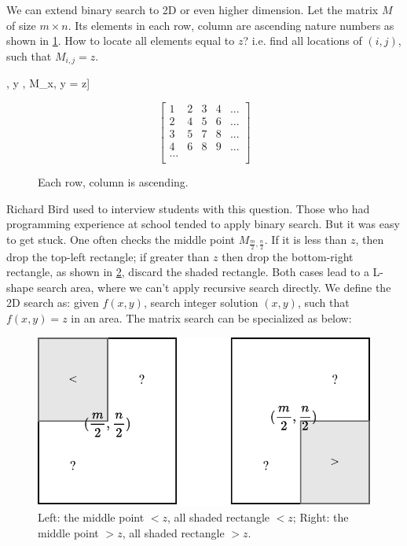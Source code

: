 \documentclass[b5paper]{article}
\begin{document}
We can extend binary search to 2D or even higher dimension. Let the matrix $M$ of size $m \times n$. Its elements in each row, column are ascending nature numbers as shown in \cref{fig:matrix-eg}. How to locate all elements equal to $z$? i.e. find all locations of $(i, j)$, such that $M_{i,j} = z$.

\be
[(x, y) | x \gets [1, 2,..., m], y \gets [1, 2,..., n], M_{x, y} = z]
\label{eq:bsearch-brute}
\ee

\begin{figure}[htbp]
 \centering
\[
\left [
  \begin{array}{ccccc}
    1 & 2 & 3 & 4 & ... \\
    2 & 4 & 5 & 6 & ... \\
    3 & 5 & 7 & 8 & ... \\
    4 & 6 & 8 & 9 & ... \\
    ... \\
  \end{array}
\right ]
\]
\caption{Each row, column is ascending.}
\label{fig:matrix-eg}
\end{figure}

Richard Bird used to interview students with this question\cite{fp-pearls}. Those who had programming experience at school tended to apply binary search. But it was easy to get stuck. One often checks the middle point $M_{\frac{m}{2}, \frac{n}{2}}$. If it is less than $z$, then drop the top-left rectangle; if greater than $z$ then drop the bottom-right rectangle, as shown in \cref{fig:bsearch-2D}, discard the shaded rectangle. Both cases lead to a L-shape search area, where we can't apply recursive search directly. We define the 2D search as: given $f(x, y)$, search integer solution $(x, y)$, such that $f(x, y) = z$ in an area. The matrix search can be specialized as below:

\begin{figure}[htbp]
 \centering
 \includegraphics[scale=0.5]{img/binary-search-2d}
 \caption{Left: the middle point $< z$, all shaded rectangle $< z$; Right: the middle point $> z$, all shaded rectangle $> z$.}
 \label{fig:bsearch-2D}
\end{figure}
\end{document}
